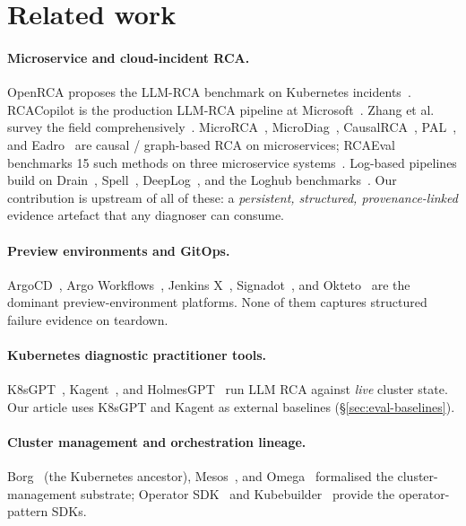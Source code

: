 \documentclass[sigconf, nonacm=true, anonymous=false, review=false]{acmart}
\begin{document}
\section{Related work}
\label{sec:related}

\paragraph{Microservice and cloud-incident RCA.} OpenRCA proposes
the LLM-RCA benchmark on Kubernetes incidents~\cite{openrca_2025}.
RCACopilot is the production LLM-RCA pipeline at
Microsoft~\cite{rcacopilot_2024}. Zhang et al. survey the field
comprehensively~\cite{zhang_microservice_diagnosis_survey_2025}.
MicroRCA~\cite{microrca_2020}, MicroDiag~\cite{microdiag_2021},
CausalRCA~\cite{causalrca_2023}, PAL~\cite{pal_2011}, and
Eadro~\cite{eadro_2023} are causal / graph-based RCA on
microservices; RCAEval benchmarks 15 such methods on three
microservice systems~\cite{rcaeval_2024}. Log-based pipelines
build on Drain~\cite{drain_2017}, Spell~\cite{spell_2016},
DeepLog~\cite{deeplog_2017}, and the Loghub
benchmarks~\cite{loghub_2023}. Our contribution is upstream of all
of these: a \emph{persistent, structured, provenance-linked}
evidence artefact that any diagnoser can consume.

\paragraph{Preview environments and GitOps.} ArgoCD~\cite{argocd_cncf,
argocd_pr_generator}, Argo Workflows~\cite{argo_workflows_cncf},
Jenkins X~\cite{jenkinsx_preview_envs},
Signadot~\cite{signadot_preview_envs}, and
Okteto~\cite{okteto_preview_envs} are the dominant preview-environment
platforms. None of them captures structured failure evidence
on teardown.

\paragraph{Kubernetes diagnostic practitioner tools.}
K8sGPT~\cite{k8sgpt_cncf}, Kagent~\cite{kagent}, and
HolmesGPT~\cite{holmesgpt_robusta} run LLM RCA against \emph{live}
cluster state. Our article uses K8sGPT and Kagent as external
baselines (\S\ref{sec:eval-baselines}).

\paragraph{Cluster management and orchestration lineage.}
Borg~\cite{borg_2015} (the Kubernetes ancestor),
Mesos~\cite{mesos_2011}, and Omega~\cite{omega_2013} formalised
the cluster-management substrate; Operator
SDK~\cite{operator_sdk_cncf} and Kubebuilder~\cite{kubebuilder_sigs}
provide the operator-pattern SDKs.
\end{document}
